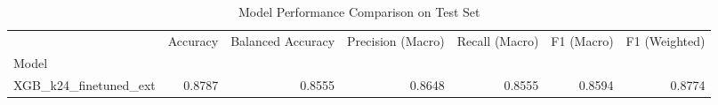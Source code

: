 \begin{table}
\caption{Model Performance Comparison on Test Set}
\label{tab:model_comparison}
\begin{tabular}{lrrrrrr}
\toprule
 & Accuracy & Balanced Accuracy & Precision (Macro) & Recall (Macro) & F1 (Macro) & F1 (Weighted) \\
Model &  &  &  &  &  &  \\
\midrule
XGB_k24_finetuned_ext & 0.8787 & 0.8555 & 0.8648 & 0.8555 & 0.8594 & 0.8774 \\
\bottomrule
\end{tabular}
\end{table}
